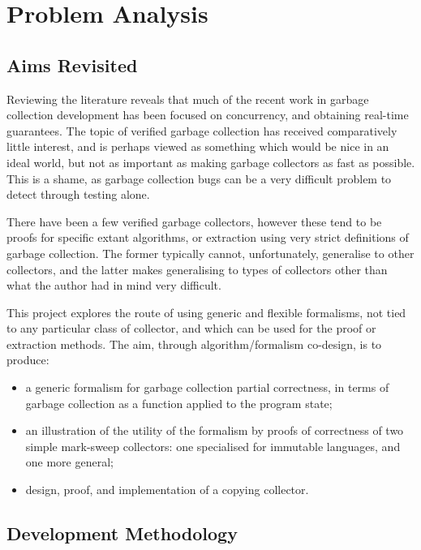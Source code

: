 \chapter{Problem Analysis}

\section{Aims Revisited}

Reviewing the literature reveals that much of the recent work in
garbage collection development has been focused on concurrency, and
obtaining real-time guarantees. The topic of verified garbage
collection has received comparatively little interest, and is perhaps
viewed as something which would be nice in an ideal world, but not as
important as making garbage collectors as fast as possible. This is a
shame, as garbage collection bugs can be a very difficult problem to
detect through testing alone.

There have been a few verified garbage collectors, however these tend
to be proofs for specific extant algorithms, or extraction using very
strict definitions of garbage collection. The former typically cannot,
unfortunately, generalise to other collectors, and the latter makes
generalising to types of collectors other than what the author had in
mind very difficult.

This project explores the route of using generic and flexible
formalisms, not tied to any particular class of collector, and which
can be used for the proof or extraction methods. The aim, through
algorithm/formalism co-design, is to produce:

\begin{itemize}
  \item a generic formalism for garbage collection partial
    correctness, in terms of garbage collection as a function applied
    to the program state;

  \item an illustration of the utility of the formalism by proofs of
    correctness of two simple mark-sweep collectors: one specialised
    for immutable languages, and one more general;

  \item design, proof, and implementation of a copying collector.
\end{itemize}

\section{Development Methodology}

